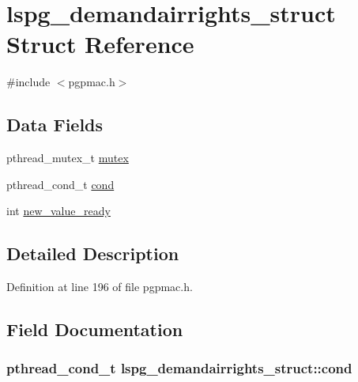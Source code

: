 \hypertarget{structlspg__demandairrights__struct}{\section{lspg\-\_\-demandairrights\-\_\-struct Struct Reference}
\label{structlspg__demandairrights__struct}
}


{\ttfamily \#include $<$pgpmac.\-h$>$}

\subsection*{Data Fields}
\begin{DoxyCompactItemize}
\item 
pthread\-\_\-mutex\-\_\-t \hyperlink{structlspg__demandairrights__struct_a874970af767d4bb329f9764075b30096}{mutex}
\item 
pthread\-\_\-cond\-\_\-t \hyperlink{structlspg__demandairrights__struct_addc1e3476a3f282a19b335f7875861d1}{cond}
\item 
int \hyperlink{structlspg__demandairrights__struct_ad686c9a04d0c7e10b236c234eaf03ce7}{new\-\_\-value\-\_\-ready}
\end{DoxyCompactItemize}


\subsection{Detailed Description}


Definition at line 196 of file pgpmac.\-h.



\subsection{Field Documentation}
\hypertarget{structlspg__demandairrights__struct_addc1e3476a3f282a19b335f7875861d1}{
\subsubsection[{cond}]{\setlength{\rightskip}{0pt plus 5cm}pthread\-\_\-cond\-\_\-t lspg\-\_\-demandairrights\-\_\-struct\-::cond}}\label{structlspg__demandairrights__struct_addc1e3476a3f282a19b335f7875861d1}


